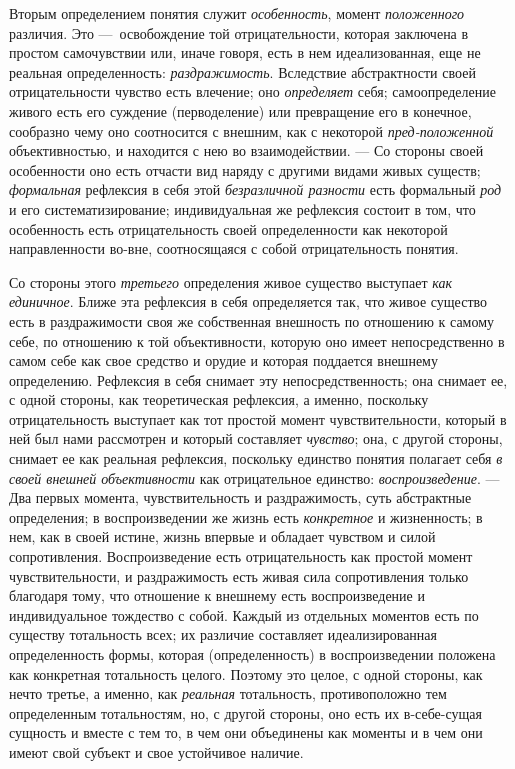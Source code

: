 \documentclass[twoside]{article}
\begin{document}
{{{Вторым определением понятия служит
{\em особенность}, момент
{\em положенного}
различия. Это —~освобождение той
отрицательности, которая заключена в простом самочувствии или, иначе
говоря, есть в нем идеализованная, еще не реальная определенность:
{\em раздражимость}.
Вследствие абстрактности своей отрицательности чувство есть
влечение; оно {\em определяет}
себя; самоопределение живого есть его суждение (перводеление)
или превращение его в конечное, сообразно чему оно соотносится с внешним,
как с некоторой {\em пред-положенной}
объективностью, и находится с нею во взаимодействии. —
Со стороны своей особенности оно есть отчасти вид наряду с
другими видами живых существ;
{\em формальная}
рефлексия в себя этой
{\em безразличной разности}
есть формальный {\em род}
и его систематизирование; индивидуальная же рефлексия состоит
в том, что особенность есть отрицательность своей определенности как
некоторой направленности во-вне, соотносящаяся с собой отрицательность
понятия.

Со стороны этого
{\em третьего}
определения живое существо выступает
{\em как единичное}.
Ближе эта рефлексия в себя определяется так, что живое
существо есть в раздражимости своя же собственная внешность по отношению к
самому себе, по отношению к той объективности, которую оно имеет
непосредственно в самом себе как свое средство и орудие и которая поддается
внешнему определению. Рефлексия в себя снимает эту непосредственность; она
снимает ее, с одной стороны, как теоретическая рефлексия, а именно,
поскольку отрицательность выступает как тот простой момент
чувствительности, который в ней был нами рассмотрен и который составляет
{\em чувство}; она, с
другой стороны, снимает ее как реальная рефлексия, поскольку единство
понятия полагает себя {\em в своей
внешней объективности} как отрицательное единство:
{\em воспроизведение}. —
Два первых момента, чувствительность и раздражимость, суть
абстрактные определения; в воспроизведении же жизнь есть
{\em конкретное} и
жизненность; в нем, как в своей истине, жизнь впервые и обладает чувством и
силой сопротивления. Воспроизведение есть отрицательность как простой
момент чувствительности, и раздражимость есть живая сила сопротивления
только благодаря тому, что отношение к внешнему есть воспроизведение и
индивидуальное тождество с собой. Каждый из отдельных
моментов есть по существу тотальность всех; их различие составляет
идеализированная определенность формы, которая (определенность) в
воспроизведении положена как конкретная тотальность целого. Поэтому это
целое, с одной стороны, как нечто третье, а именно, как
{\em реальная}
тотальность, противоположно тем определенным тотальностям,
но, с другой стороны, оно есть их в-себе-сущая сущность и вместе с тем то,
в чем они объединены как моменты и в чем они имеют свой субъект и свое
устойчивое наличие.

}}}
\end{document}
